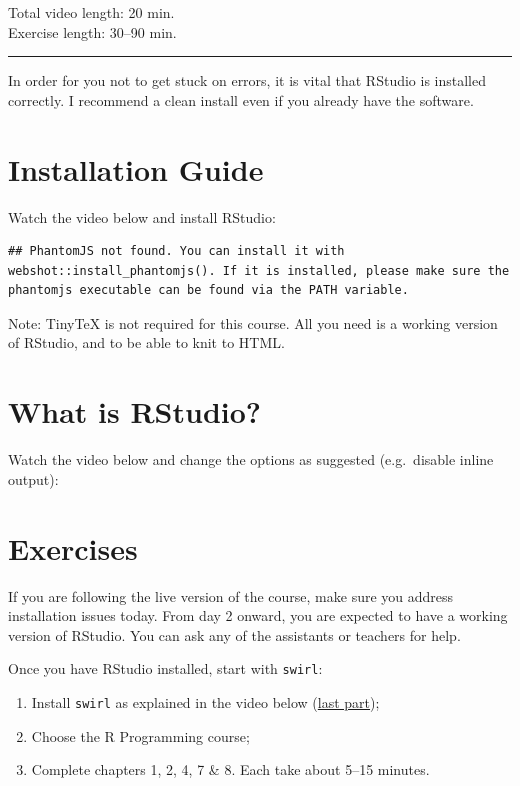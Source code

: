 \documentclass[
]{book}
\providecommand{\tightlist}{%
  \setlength{\itemsep}{0pt}\setlength{\parskip}{0pt}}
\begin{document}
Total video length: 20 min.\\
Exercise length: 30--90 min.

\begin{center}\rule{0.5\linewidth}{0.5pt}\end{center}

In order for you not to get stuck on errors, it is vital that RStudio is installed correctly. I recommend a clean install even if you already have the software.

\hypertarget{installation-guide}{%
\section{Installation Guide}\label{installation-guide}}

Watch the video below and install RStudio:

\begin{verbatim}
## PhantomJS not found. You can install it with webshot::install_phantomjs(). If it is installed, please make sure the phantomjs executable can be found via the PATH variable.
\end{verbatim}

Note: TinyTeX is not required for this course. All you need is a working version of RStudio, and to be able to knit to HTML.

\hypertarget{what-is-rstudio}{%
\section{What is RStudio?}\label{what-is-rstudio}}

Watch the video below and change the options as suggested (e.g.~disable inline output):

\hypertarget{exercises}{%
\section{Exercises}\label{exercises}}

If you are following the live version of the course, make sure you address installation issues today. From day 2 onward, you are expected to have a working version of RStudio. You can ask any of the assistants or teachers for help.

Once you have RStudio installed, start with \texttt{swirl}:

\begin{enumerate}
\def\labelenumi{\arabic{enumi}.}
\tightlist
\item
  Install \texttt{swirl} as explained in the video below (\href{https://youtu.be/eKKil5iyxLM?t=148}{last part});
\item
  Choose the R Programming course;
\item
  Complete chapters 1, 2, 4, 7 \& 8. Each take about 5--15 minutes.
\end{enumerate}
\end{document}
